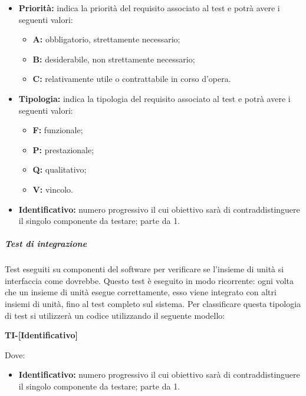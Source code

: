                 \begin{itemize}
	                \item \textbf{Priorità:} indica la priorità del requisito associato al test e potrà avere i seguenti valori:
		                \begin{itemize}
		                    \item \textbf{A:} obbligatorio, strettamente necessario;
		                    \item \textbf{B:} desiderabile, non strettamente necessario;
		                    \item \textbf{C:} relativamente utile o contrattabile in corso d'opera. 
		                 \end{itemize} 
	                 \item \textbf{Tipologia:} indica la tipologia del requisito associato al test e potrà avere i seguenti valori:
		                 \begin{itemize}
		                    \item \textbf{F:} funzionale;
		                    \item \textbf{P:} prestazionale;
		                    \item \textbf{Q:} qualitativo;
		                    \item \textbf{V:} vincolo.
		                 \end{itemize}
	                \item \textbf{Identificativo:} numero progressivo il cui obiettivo sarà di contraddistinguere il singolo componente da testare; parte da 1.
                \end{itemize}

                 \subparagraph*{Test di integrazione}
        			Test eseguiti su componenti del software per verificare se l'insieme di unità si interfaccia come dovrebbe. Questo test è eseguito in modo ricorrente: ogni volta che un insieme di unità esegue correttamente, esso viene integrato con altri insiemi di unità, fino al test completo sul sistema.
                    Per classificare questa tipologia di test si utilizzerà un codice utilizzando il seguente modello:     

                        \begin{center}
                        	\textbf{TI-[Identificativo]}
                        \end{center}
                        Dove:
                        
						\begin{itemize}
                       		\item \textbf{Identificativo:} numero progressivo il cui obiettivo sarà di contraddistinguere il singolo componente da testare; parte da 1.
						\end{itemize}
					
